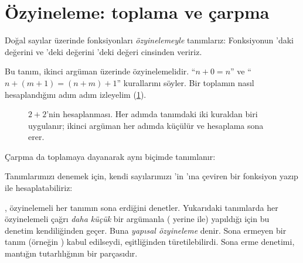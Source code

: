 \section{Özyineleme: toplama ve çarpma}\label{sec:ozyineleme}

Doğal sayılar üzerinde fonksiyonları \emph{özyinelemeyle} tanımlarız:
Fonksiyonun 'daki değerini ve 'deki değerini
'deki değeri cinsinden veririz.


\noindent Bu tanım, ikinci argüman üzerinde özyinelemelidir. ``$n + 0 = n$''
ve ``$n + (m+1) = (n+m)+1$'' kurallarını söyler. Bir toplamın nasıl
hesaplandığını adım adım izleyelim (\cref{fig:hesaplama-izi}).

\begin{figure}[htbp]
\centering
{}
\caption{$2 + 2$'nin hesaplanması. Her adımda tanımdaki iki kuraldan biri
uygulanır; ikinci argüman her adımda küçülür ve hesaplama sona erer.}
\label{fig:hesaplama-izi}
\end{figure}

Çarpma da toplamaya dayanarak aynı biçimde tanımlanır:


\noindent Tanımlarımızı denemek için, kendi sayılarımızı \Lean{}'in
'ına çeviren bir fonksiyon yazıp \lc{\textcolor{leancmd}{\bfseries\#eval}}
ile hesaplatabiliriz:


\begin{dikkat}
\Lean{}, özyinelemeli her tanımın sona erdiğini denetler. Yukarıdaki
tanımlarda her özyinelemeli çağrı \emph{daha küçük} bir argümanla
( yerine  ile) yapıldığı için bu denetim kendiliğinden
geçer. Buna \emph{yapısal özyineleme} denir. Sona ermeyen bir tanım
(örneğin ) kabul edilseydi, 
eşitliğinden  türetilebilirdi. Sona erme denetimi, mantığın
tutarlılığının bir parçasıdır.
\end{dikkat}

